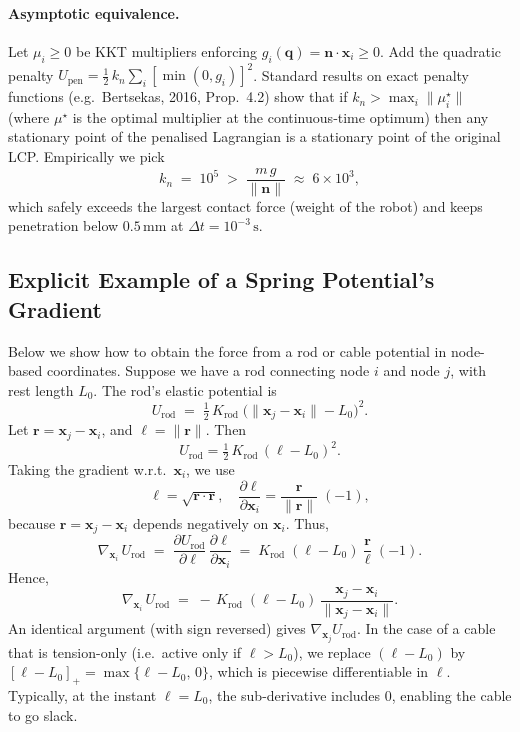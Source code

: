 \documentclass[12pt,letterpaper]{article}
\newcommand{\q}{\bm{q}}
\newcommand{\x}{\bm{x}}
\newcommand{\bfn}{\bm{n}}
\begin{document}
\paragraph{Asymptotic equivalence.}
Let $\mu_i\ge0$ be KKT multipliers enforcing $g_i(\q)=\bfn\!\cdot\!\x_i\ge0$.
Add the quadratic penalty $U_{\mathrm{pen}}=\frac12\,k_n\sum_i[\min(0,g_i)]^2$.
Standard results on exact penalty functions (e.g.\ Bertsekas, 2016, Prop.~4.2)
show that if $k_n > \max_i \|\mu_i^\star\|$ (where $\mu^\star$ is the optimal
multiplier at the continuous‑time optimum) then any stationary point of the
penalised Lagrangian is a stationary point of the original LCP.  Empirically we
pick
\[
  k_n \;=\; 10^5 \;>\;
  \frac{m\,g}{\|\bfn\|}\;\approx\;6\times10^3,
\]
which safely exceeds the largest contact force (weight of the robot) and keeps
penetration below $0.5\,\mathrm{mm}$ at $\Delta t=10^{-3}\,\mathrm{s}$.

\subsection{Explicit Example of a Spring Potential’s Gradient}
Below we show how to obtain the force from a rod or cable potential in node-based coordinates. Suppose we have a rod connecting node $i$ and node $j$, with rest length $L_{0}$. The rod’s elastic potential is
\[
  U_{\mathrm{rod}}
  \;=\;\tfrac12\, K_{\mathrm{rod}}\;\bigl( \|\x_j - \x_i\| - L_{0}\bigr)^2.
\]
Let $\bm{r} = \x_j - \x_i$, and $\ell = \|\bm{r}\|$. Then
\[
  U_{\mathrm{rod}} = \tfrac12\, K_{\mathrm{rod}}\, (\ell - L_{0})^2.
\]
Taking the gradient w.r.t.\ $\x_i$, we use
\[
  \ell = \sqrt{\bm{r}\cdot\bm{r}}, \quad
  \frac{\partial \ell}{\partial \x_i}
     = \frac{\bm{r}}{\|\bm{r}\|}\;(-1),
\]
because $\bm{r} = \x_j - \x_i$ depends negatively on $\x_i$. Thus,
\[
  \nabla_{\!\x_i}\,U_{\mathrm{rod}}
  \;=\;\frac{\partial U_{\mathrm{rod}}}{\partial \ell}\,
        \frac{\partial \ell}{\partial \x_i}
  \;=\; K_{\mathrm{rod}}\;(\ell - L_{0})\;\frac{\bm{r}}{\ell}\;(-1).
\]
Hence,
\[
  \nabla_{\!\x_i}\,U_{\mathrm{rod}}
  \;=\;-\,K_{\mathrm{rod}}\;(\ell - L_{0})\,\frac{\x_j - \x_i}{\|\x_j - \x_i\|}.
\]
An identical argument (with sign reversed) gives $\nabla_{\!\x_j} U_{\mathrm{rod}}$. In the case of a cable that is tension-only (i.e.\ active only if $\ell > L_0$), we replace $(\ell - L_0)$ by $[\ell - L_0]_+ = \max\{\ell - L_0,\,0\}$, which is piecewise differentiable in $\ell$. Typically, at the instant $\ell = L_0$, the sub-derivative includes $0$, enabling the cable to go slack.
\end{document}
